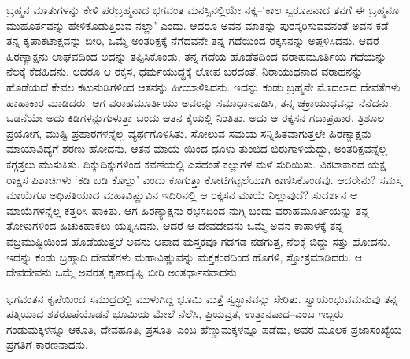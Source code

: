 ಬ್ರಹ್ಮನ ಮಾತುಗಳನ್ನು ಕೇಳಿ ಪರಬ್ರಹ್ಮನಾದ ಭಗವಂತ ಮನಸ್ಸಿನಲ್ಲಿಯೇ ನಕ್ಕ–‘ಕಾಲ ಸ್ವರೂಪನಾದ ತನಗೆ ಈ ಬ್ರಹ್ಮನೂ ಮುಹೂರ್ತವನ್ನು ಹೇಳಿಕೊಡುತ್ತಿರುವ ನಲ್ಲಾ’ ಎಂದು. ಆದರೂ ಅವನ ಮಾತನ್ನು ಪುರಸ್ಕರಿಸುವವನಂತೆ ಅವನ ಕಡೆ ತನ್ನ ಕೃಪಾಕಟಾಕ್ಷವನ್ನು ಬೀರಿ, ಒಮ್ಮೆ ಅಂತರಿಕ್ಷಕ್ಕೆ ನೆಗೆದವನೇ ತನ್ನ ಗದೆಯಿಂದ ರಕ್ಕಸನನ್ನು ಅಪ್ಪಳಿಸಿದನು. ಆದರೆ ಹಿರಣ್ಯಾಕ್ಷನು ಲಾಘವದಿಂದ ಅದನ್ನು ತಪ್ಪಿಸಿಕೊಂಡು, ತನ್ನ ಗದೆಯ ಹೊಡೆತದಿಂದ ವರಾಹಮೂರ್ತಿಯ ಗದೆಯನ್ನು ನೆಲಕ್ಕೆ ಕೆಡಹಿದನು. ಆದರೂ ಆ ರಕ್ಕಸ, ಧರ್ಮಯುದ್ಧಕ್ಕೆ ಲೋಪ ಬರದಂತೆ, ನಿರಾಯುಧನಾದ ವರಾಹನನ್ನು ಹೊಡೆಯದೆ ಕೇವಲ ಕಟುನುಡಿಗಳಿಂದ ಆತನನ್ನು ಹೀಯಾಳಿಸಿದನು. ಇದನ್ನು ಕಂಡು ಬ್ರಹ್ಮನೇ ಮೊದಲಾದ ದೇವತೆಗಳು ಹಾಹಾಕಾರ ಮಾಡಿದರು. ಆಗ ವರಾಹಮೂರ್ತಿಯು ಅವರನ್ನು ಸಮಾಧಾನಪಡಿಸಿ, ತನ್ನ ಚಕ್ರಾಯುಧವನ್ನು ನೆನೆದನು. ಒಡನೆಯೇ ಅದು ಕಿಡಿಗಳನ್ನುಗುಳುತ್ತಾ ಬಂದು ಆತನ ಕೈಯಲ್ಲಿ ನಿಂತಿತು. ಅದು ಆ ರಕ್ಕಸನ ಗದಾಪ್ರಹಾರ, ತ್ರಿಶೂಲ ಪ್ರಯೋಗ, ಮುಷ್ಟಿ ಪ್ರಹಾರಗಳನ್ನೆಲ್ಲ ವ್ಯರ್ಥಗೊಳಿಸಿತು. ಸೋಲುವ ಸಮಯ ಸನ್ನಿಹಿತವಾಗುತ್ತಲೇ ಹಿರಣ್ಯಾಕ್ಷನು ಮಾಯಾವಿದ್ಯೆಗೆ ಶರಣು ಹೋದನು. ಆತನ ಮಾಯೆ ಯಿಂದ ಧೂಳು ತುಂಬಿದ ಬಿರುಗಾಳಿಯೆದ್ದು, ಅಂತರಿಕ್ಷವನ್ನೆಲ್ಲ ಕಗ್ಗತ್ತಲು ಮುಸುಕಿತು. ದಿಕ್ಕುದಿಕ್ಕುಗಳಿಂದ ಕವಣೆಯಲ್ಲಿ ಎಸೆದಂತೆ ಕಲ್ಲುಗಳ ಮಳೆ ಸುರಿಯಿತು. ವಿಕಟಾಕಾರದ ಯಕ್ಷ ರಾಕ್ಷಸ ಪಿಶಾಚಿಗಳು ‘ಕಡಿ ಬಡಿ ಕೊಲ್ಲು’ ಎಂದು ಕೂಗುತ್ತಾ ಕೋಟಿಗಟ್ಟಲೆಯಾಗಿ ಕಾಣಿಸಿಕೊಂಡವು. ಆದರೇನು? ಸಮಸ್ತ ಮಾಯೆಗೂ ಅಧಿಪತಿಯಾದ ಮಹಾವಿಷ್ಣುವಿನ ಇದಿರಿನಲ್ಲಿ ಆ ರಕ್ಕಸನ ಮಾಯೆ ನಿಲ್ಲುವುದೆ? ಸುದರ್ಶನ ಆ ಮಾಯೆಗಳನ್ನೆಲ್ಲ ಕತ್ತರಿಸಿ ಹಾಕಿತು. ಆಗ ಹಿರಣ್ಯಾಕ್ಷನು ರಭಸದಿಂದ ನುಗ್ಗಿ ಬಂದು ವರಾಹಮೂರ್ತಿಯನ್ನು ತನ್ನ ತೋಳುಗಳಿಂದ ಹಿಚುಕಿಹಾಕಲು ಯತ್ನಿಸಿದನು. ಆದರೆ ಆ ದೇವದೇವನು ಒಮ್ಮೆ ಅವನ ಕಾಪಾಳಕ್ಕೆ ತನ್ನ ವಜ್ರಮುಷ್ಟಿಯಿಂದ ಹೊಡೆಯುತ್ತಲೆ ಅವನು ಆಪಾದ ಮಸ್ತಕವೂ ಗಡಗಡ ನಡಗುತ್ತ, ನೆಲಕ್ಕೆ ಬಿದ್ದು ಸತ್ತು ಹೋದನು. ಇದನ್ನು ಕಂಡು ಬ್ರಹ್ಮಾದಿ ದೇವತೆಗಳು ಮಹಾವಿಷ್ಣುವನ್ನು ಮಕ್ತಕಂಠದಿಂದ ಹೊಗಳಿ, ಸ್ತೋತ್ರಮಾಡಿದರು. ಆ ದೇವದೇವನು ಒಮ್ಮೆ ಅವರತ್ತ ಕೃಪಾದೃಷ್ಟಿ ಬೀರಿ ಅಂತರ್ಧಾನವಾದನು.

ಭಗವಂತನ ಕೃಪೆಯಿಂದ ಸಮುದ್ರದಲ್ಲಿ ಮುಳುಗಿದ್ದ ಭೂಮಿ ಮತ್ತೆ ಸ್ವಸ್ಥಾನವನ್ನು ಸೇರಿತು. ಸ್ವಾಯಂಭುವಮನುವು ತನ್ನ ಪತ್ನಿಯಾದ ಶತರೂಪೆಯೊಡನೆ ಭೂಮಿಯ ಮೇಲೆ ನೆಲೆಸಿ, ಪ್ರಿಯವ್ರತ, ಉತ್ತಾನಪಾದ–ಎಂಬ ಇಬ್ಬರು ಗಂಡುಮಕ್ಕಳನ್ನೂ ಆಕೂತಿ, ದೇವಹೂತಿ, ಪ್ರಸೂತಿ–ಎಂಬ ಹೆಣ್ಣುಮಕ್ಕಳನ್ನೂ ಪಡೆದು, ಅವರ ಮೂಲಕ ಪ್ರಜಾಸಂಖ್ಯೆಯ ಪ್ರಗತಿಗೆ ಕಾರಣನಾದನು. 

